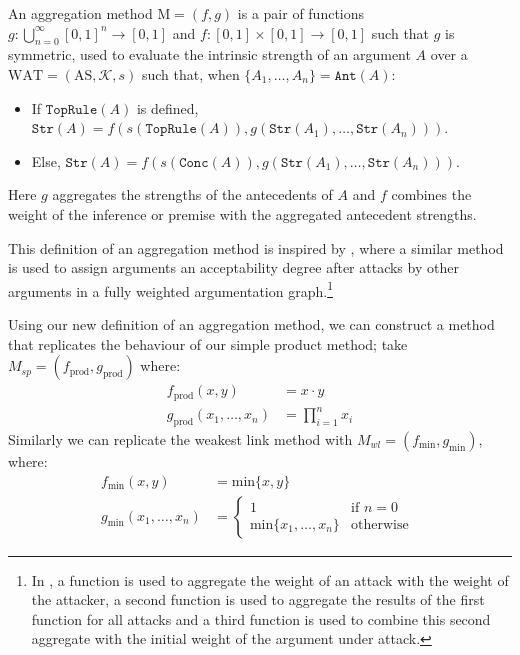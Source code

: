 \documentclass[runningheads]{llncs}
\newcommand{\K}{\mathcal{K}}
\newcommand{\Conc}{\texttt{Conc}}
\newcommand{\TopRule}{\texttt{TopRule}}
\newcommand{\Ant}{\texttt{Ant}}
\newcommand{\Str}{\texttt{Str}}
\begin{document}
\begin{definition}\label{AM}
An aggregation method $\text{M} = ( f,g )$ is a pair of functions $g: \bigcup_{n=0}^{\infty} [0,1]^n \rightarrow [0,1]$ and $f: [0,1] \times [0,1] \rightarrow [0,1]$ such that $g$ is symmetric, used to evaluate the intrinsic strength of an argument $A$ over a $\text{WAT} = ( \text{AS}, \K, s )$ such that, when $\{A_1,\dots,A_n\} = \Ant(A)$:
\begin{itemize}
    \item If $\TopRule(A)$ is defined, $\Str(A) = f(s(\TopRule(A)),g(\Str(A_1),\dots,\Str(A_n)))$.
    \item Else, $\Str(A) = f(s(\Conc(A)),g(\Str(A_1),\dots,\Str(A_n)))$.
\end{itemize}
Here $g$ aggregates the strengths of the antecedents of $A$ and $f$ combines the weight of the inference or premise with the aggregated antecedent strengths.
\end{definition}

This definition of an aggregation method is inspired by \cite{DBLP:conf/atal/AmgoudD19}, where a similar method is used to assign arguments an acceptability degree after attacks by other arguments in a fully weighted argumentation graph.\footnote{In \cite{DBLP:conf/atal/AmgoudD19}, a function is used to aggregate the weight of an attack with the weight of the attacker, a second function is used to aggregate the results of the first function for all attacks and a third function is used to combine this second aggregate with the initial weight of the argument under attack.} 

Using our new definition of an aggregation method, we can construct a method that replicates the behaviour of our simple product method; take $M_{sp} = (f_{\text{prod}},g_{\text{prod}})$ where:
\begin{align*}
    f_{\text{prod}}(x,y) &= x \cdot y\\
    g_{\text{prod}}(x_1,\dots,x_n) &= \prod_{i=1}^{n} x_i
\end{align*}
Similarly we can replicate the weakest link method with $M_{wl} = (f_{\text{min}},g_{\text{min}})$, where:
\begin{align*}
    f_{\text{min}}(x,y) &= \text{min}\{x,y\}\\
    g_{\text{min}}(x_1,\dots,x_n) &= \begin{cases} 1 &\mbox{if } n=0 \\
\text{min}\{x_1,\dots,x_n\} &\mbox{otherwise }\end{cases}
\end{align*}
\end{document}
